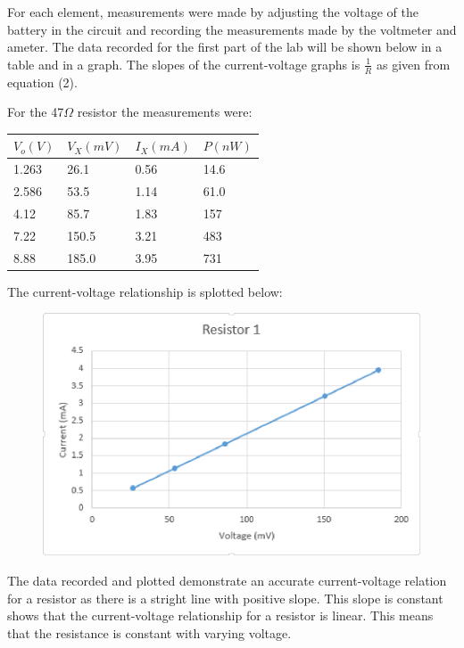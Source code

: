 \documentclass[twocolumn, amsmath]{revtex4}
\begin{document}
For each element, measurements were made by adjusting the voltage of the battery in the circuit and recording the measurements made by the voltmeter and ameter. The data recorded for the first part of the lab will be shown below in a table and in a graph. The slopes of the current-voltage graphs is $\frac{1}{R}$ as given from equation (2).


For the 47$\Omega$ resistor the measurements were:

\begin{center}
    \begin{tabular}{| l | l | l | l |}
    \hline
    $V_{o} (V)$ & $V_{X} (mV)$  & $I_{X} (mA)$ & $P (nW)$ \\ \hline
    
    1.263	& 26.1  	& 0.56  &   14.6	 \\ \hline
    2.586	& 53.5  	& 1.14 	 &  61.0	\\ \hline
    4.12	& 85.7  	& 1.83	 &  157	\\ \hline
    7.22    	& 150.5  	& 3.21  &  483	 \\ \hline
    8.88   	& 185.0    	& 3.95  &   731	 	\\ 
    \hline
    \end{tabular}
\end{center}

The current-voltage relationship is splotted below:
	
\begin{figure}[h]  

\includegraphics[scale = 0.4]{Resistor.eps}  
\end{figure}

The data recorded and plotted demonstrate an accurate current-voltage relation for a resistor as there is a stright line with positive slope. This slope is constant shows that the current-voltage relationship for a resistor is linear. This means that the resistance is constant with varying voltage.
\end{document}
